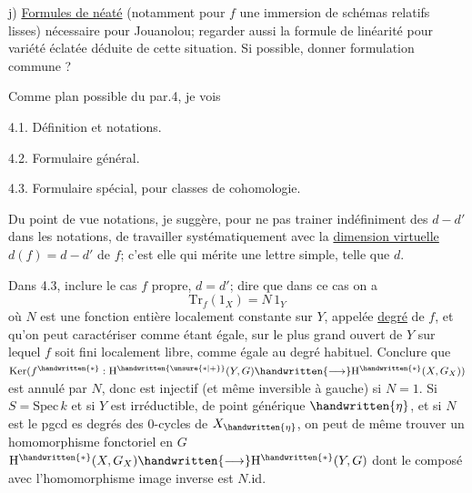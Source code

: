  j) \uline{Formules de néaté} (notamment pour $f$ une immersion de schémas relatifs lisses)\handwritten{,} nécessaire pour Jouanolou; regarder aussi la formule de linéarité pour variété éclatée déduite de cette situation. Si possible, donner formulation commune ?

Comme plan possible du par.4, je vois

4.1. Définition et notations.

4.2. Formulaire général.

4.3. Formulaire spécial, pour classes de cohomologie.

Du point de vue notations, je suggère, pour ne pas trainer indéfiniment des $d-d'$ dans les notations, de travailler systématiquement avec la \uline{dimension virtuelle} $d(f)=d-d'$ de $f$; c'est elle qui mérite une lettre simple, telle que $d$.

Dans 4.3, inclure le cas $f$ propre, $d=d'$; dire que dans ce  cas on a
\[
\mathrm{Tr}_f(1_X)=N\,1_Y
\]
où $N$ est une fonction entière localement constante sur $Y$, appelée \uline{degré} de $f$, et qu'on peut caractériser comme étant égale, sur  le plus grand ouvert de $Y$ sur lequel $f$ soit fini localement libre, comme égale au degré habituel. Conclure que $\mathrm{Ker}(f^{\handwritten{*}}:\mathrm{H}^{\handwritten{\unsure{*|+}}}(Y,G)\handwritten{\longrightarrow}\mathrm{H}^{\handwritten{*}}(X,G_X))$ est annulé par $N$, donc est injectif (et même inversible à gauche) si $N=1$. \handwritten{[}Si $S=\mathrm{Spec}\,k$ et si $Y$ est irréductible, de point générique $\handwritten{\eta}$, et si $N$ est le pgcd es degrés des $0$-cycles de $X_{\handwritten{\eta}}$\inserted{\handwritten{$\neq\unsure{\phi|\varnothing}$}}, on peut de même trouver un homomorphisme\handwritten{,} fonctoriel en $G$\handwritten{\unsure{$\leftarrow$}}\handwritten{,} $\mathrm{H}^{\handwritten{*}}(X,G_X)\handwritten{\longrightarrow}\mathrm{H}^{\handwritten{*}}(Y,G)$ dont le composé avec l'homomorphisme image inverse est $N.\mathrm{id}$.\handwritten{]}


